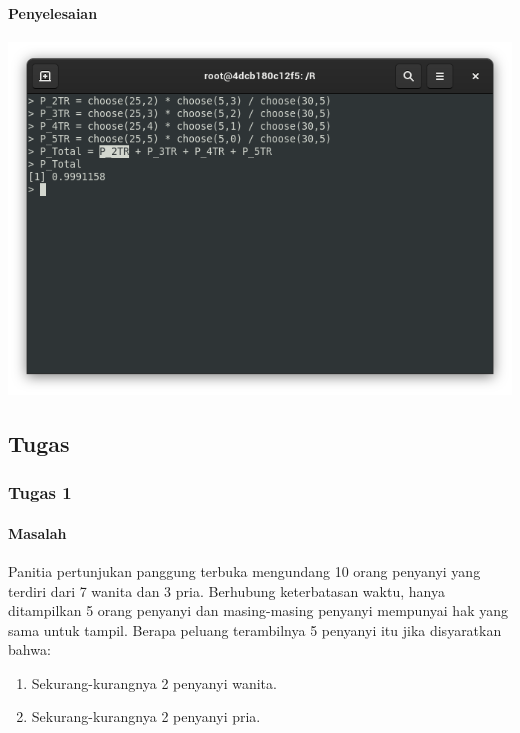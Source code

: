 \documentclass[a4paper,12pt]{article}
\begin{document}
\paragraph{Penyelesaian\\}
\begin{center}
	\includegraphics[scale=.5]{lat6}
\end{center}

\subsection{Tugas}
\subsubsection{Tugas 1}
\paragraph{Masalah\\}
Panitia pertunjukan panggung terbuka mengundang 10 orang penyanyi yang terdiri dari 7 wanita dan 3 pria. Berhubung keterbatasan waktu, hanya ditampilkan 5 orang penyanyi dan masing-masing penyanyi mempunyai hak yang sama untuk tampil. Berapa peluang terambilnya 5 penyanyi itu jika disyaratkan bahwa: 
\begin{enumerate}[label=\alph*.]
	\item Sekurang-kurangnya 2 penyanyi wanita.
	\item Sekurang-kurangnya 2 penyanyi pria.
\end{enumerate}
\end{document}
